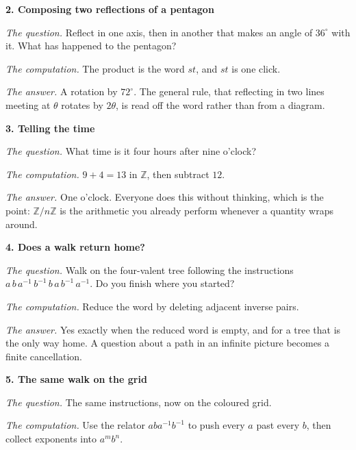 \documentclass[10pt]{article}
\newcommand{\Z}{\mathbb{Z}}
\newcommand{\inv}{^{-1}}
\begin{document}
{\begin{minipage}[t]{744pt}
\begin{minipage}[t]{368pt}
{\sffamily\bfseries\color{big} 2. Composing two reflections of a pentagon}\par\vspace{1pt}
\emph{The question.} Reflect in one axis, then in another that makes an angle of $36^\circ$ with it. What has happened to the pentagon?\par
\emph{The computation.} The product is the word $st$, and $st$ is one click.\par
\emph{The answer.} A rotation by $72^\circ$. The general rule, that reflecting in two lines meeting at $\theta$ rotates by $2\theta$, is read off the word rather than from a diagram.\par\vspace{4pt}
{\sffamily\bfseries\color{big} 3. Telling the time}\par\vspace{1pt}
\emph{The question.} What time is it four hours after nine o'clock?\par
\emph{The computation.} $9+4=13$ in $\Z$, then subtract $12$.\par
\emph{The answer.} One o'clock. Everyone does this without thinking, which is the point: $\Z/n\Z$ is the arithmetic you already perform whenever a quantity wraps around.\par
\end{minipage}\hfill
\begin{minipage}[t]{360pt}\vspace{0pt}
{\sffamily\bfseries\color{big} 4. Does a walk return home?}\par\vspace{1pt}
\emph{The question.} Walk on the four-valent tree following the instructions $a\,b\,a\inv\,b\inv\,b\,a\,b\inv\,a\inv$. Do you finish where you started?\par
\emph{The computation.} Reduce the word by deleting adjacent inverse pairs.\par
\emph{The answer.} Yes exactly when the reduced word is empty, and for a tree that is the only way home. A question about a path in an infinite picture becomes a finite cancellation.\par\vspace{4pt}
{\sffamily\bfseries\color{big} 5. The same walk on the grid}\par\vspace{1pt}
\emph{The question.} The same instructions, now on the coloured grid.\par
\emph{The computation.} Use the relator $aba\inv b\inv$ to push every $a$ past every $b$, then collect exponents into $a^mb^n$.\par

\end{minipage}
\end{minipage}}
\end{document}
